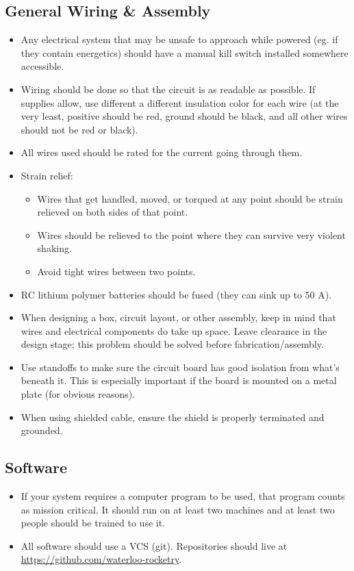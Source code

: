 \documentclass{article}
\begin{document}
\subsection{General Wiring \& Assembly}
\begin{itemize}
\item Any electrical system that may be unsafe to approach while powered (eg. if they contain energetics) should have a manual kill switch installed somewhere accessible.
\item Wiring should be done so that the circuit is as readable as possible. If supplies allow, use different a different insulation color for each wire (at the very least, positive should be red, ground should be black, and all other wires should not be red or black).
\item All wires used should be rated for the current going through them.
\item Strain relief:
    \begin{itemize}
    \item Wires that get handled, moved, or torqued at any point should be strain relieved on both sides of that point.
    \item Wires should be relieved to the point where they can survive very violent shaking.
    \item Avoid tight wires between two points.
    \end{itemize}
\item RC lithium polymer batteries should be fused (they can sink up to 50 A).
\item When designing a box, circuit layout, or other assembly, keep in mind that wires and electrical components do take up space. Leave clearance in the design stage; this problem should be solved before fabrication/assembly.
\item Use standoffs to make sure the circuit board has good isolation from what's beneath it. This is especially important if the board is mounted on a metal plate (for obvious reasons).
\item When using shielded cable, ensure the shield is properly terminated and grounded.
\end{itemize}

\subsection{Software}
\begin{itemize}
\item If your system requires a computer program to be used, that program counts as mission critical. It should run on at least two machines and at least two people should be trained to use it.
\item All software should use a VCS (git). Repositories should live at \url{https://github.com/waterloo-rocketry}.
\end{itemize}
\end{document}
